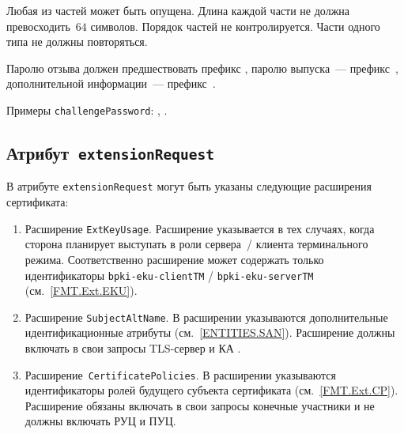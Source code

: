 Любая из частей может быть опущена. Длина каждой части не должна 
превосходить~$64$ символов. Порядок частей не контролируется.
Части одного типа не должны повторяться.

Паролю отзыва должен предшествовать префикс 
, паролю выпуска~--- префикс~,
дополнительной информации~--- префикс~.

Примеры \texttt{challengePassword}:
, .

\subsection{Атрибут~\texttt{extensionRequest}}\label{FMT.CSR.ER}

В атрибуте \texttt{extensionRequest} могут быть указаны следующие 
расширения сертификата:

\begin{enumerate}
\item 
Расширение \texttt{ExtKeyUsage}. Расширение указывается в тех случаях, 
когда сторона планирует выступать в роли сервера~/ клиента терминального 
режима. Соответственно расширение может содержать только идентификаторы  
\verb|bpki-eku-clientTM| / \verb|bpki-eku-serverTM| 
(см.~\ref{FMT.Ext.EKU}). 


\item 
Расширение \texttt{SubjectAltName}. В расширении указываются 
дополнительные идентификационные атрибуты (см.~\ref{ENTITIES.SAN}). 
Расширение должны включать в свои запросы TLS-сервер и КА 
.


\item
Расширение~\texttt{CertificatePolicies}. В расширении
указываются идентификаторы ролей будущего субъекта сертификата
(см.~\ref{FMT.Ext.CP}).
Расширение обязаны включать в свои запросы конечные участники 
и не должны включать РУЦ и ПУЦ.
\end{enumerate}
